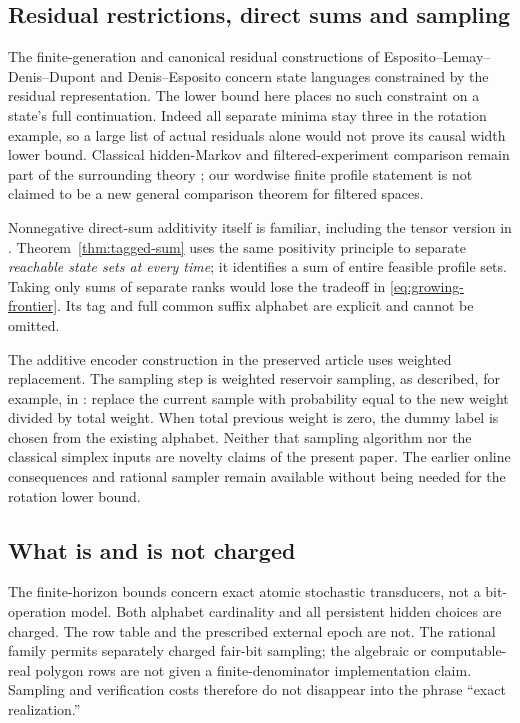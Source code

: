 \subsection{Residual restrictions, direct sums and sampling}
The finite-generation and canonical residual constructions of
Esposito--Lemay--Denis--Dupont \cite{ELDD} and Denis--Esposito
\cite[Proposition 16]{DE} concern state languages constrained by the
residual representation. The lower bound here places no such constraint
on a state's full continuation. Indeed all separate minima stay three
in the rotation example, so a large list of actual residuals alone would
not prove its causal width lower bound. Classical hidden-Markov and
filtered-experiment comparison remain part of the surrounding theory
\cite{Vidyasagar,Norberg}; our wordwise finite profile statement is not
claimed to be a new general comparison theorem for filtered spaces.

Nonnegative direct-sum additivity itself is familiar, including the
tensor version in \cite[Lemma 4.1]{QCL}. Theorem~\ref{thm:tagged-sum}
uses the same positivity principle to separate \emph{reachable state
sets at every time}; it identifies a sum of entire feasible profile
sets. Taking only sums of separate ranks would lose the tradeoff in
\eqref{eq:growing-frontier}. Its tag and full common suffix alphabet are
explicit and cannot be omitted.

The additive encoder construction in the preserved article \cite{GTF31}
uses weighted replacement. The sampling step is weighted reservoir
sampling, as described, for example, in \cite[Appendix A.2]{PBRT}:
replace the current sample with probability equal to the new weight
divided by total weight. When total previous weight is zero, the dummy
label is chosen from the existing alphabet. Neither that sampling
algorithm nor the classical simplex inputs are novelty claims of the
present paper. The earlier online consequences and rational sampler
remain available without being needed for the rotation lower bound.

\subsection{What is and is not charged}
The finite-horizon bounds concern exact atomic stochastic transducers,
not a bit-operation model. Both alphabet cardinality and all persistent
hidden choices are charged. The row table and the prescribed external
epoch are not. The rational family permits separately charged fair-bit
sampling; the algebraic or computable-real polygon rows are not given a
finite-denominator implementation claim. Sampling and verification costs
therefore do not disappear into the phrase ``exact realization.''

